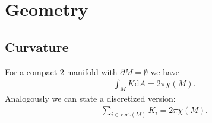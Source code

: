 \section{Geometry}
\subsection{Curvature}
\begin{ex} For a compact $2$-manifold with $\partial M = \emptyset$ we have
    \begin{align*}
        \int_M K\mathrm{d}A = 2\pi\chi(M).
    \end{align*}
    Analogously we can state a discretized version:
    \begin{align*}
        \sum_{i\in \mathrm{vert}(M)}K_i = 2\pi\chi(M).
    \end{align*}
\end{ex}